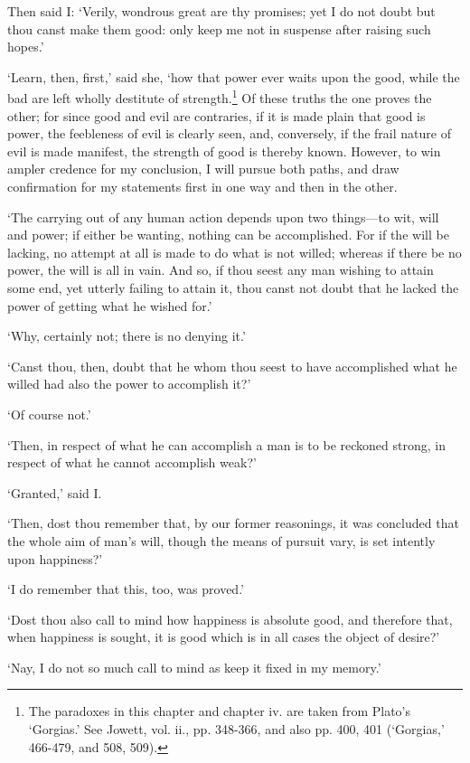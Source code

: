 \documentclass[11pt]{book}
\begin{document}
Then said I: `Verily, wondrous great are thy promises; yet I do not
doubt but thou canst make them good: only keep me not in suspense after
raising such hopes.'

`Learn, then, first,' said she, `how that power ever waits upon the  
good, while the bad are left wholly destitute of strength.\footnote{The 
paradoxes in this chapter and chapter iv. are taken from Plato's        
`Gorgias.' See Jowett, vol. ii., pp. 348-366, and also pp. 400, 401     
(`Gorgias,' 466-479, and 508, 509).} Of these truths the one proves the 
other; for since good and evil are contraries, if it is made plain that 
good is power, the feebleness of evil is clearly seen, and, conversely, 
if the frail nature of evil is made manifest, the strength of good is   
thereby known. However, to win ampler credence for my conclusion, I     
will pursue both paths, and draw confirmation for my statements first   
in one way and then in the other.                                       

`The carrying out of any human action depends upon two things---to wit,
will and power; if either be wanting, nothing can be accomplished. For
if the will be lacking, no attempt at all is made to do what is not
willed; whereas if there be no power, the will is all in vain. And so,
if thou seest any man wishing to attain some end, yet utterly failing to
attain it, thou canst not doubt that he lacked the power of getting what
he wished for.'

`Why, certainly not; there is no denying it.'

`Canst thou, then, doubt that he whom thou seest to have accomplished
what he willed had also the power to accomplish it?'

`Of course not.'

`Then, in respect of what he can accomplish a man is to be reckoned
strong, in respect of what he cannot accomplish weak?'

`Granted,' said I.

`Then, dost thou remember that, by our former reasonings, it was
concluded that the whole aim of man's will, though the means of pursuit
vary, is set intently upon happiness?'

`I do remember that this, too, was proved.'

`Dost thou also call to mind how happiness is absolute good, and
therefore that, when happiness is sought, it is good which is in all
cases the object of desire?'

`Nay, I do not so much call to mind as keep it fixed in my memory.'
\end{document}
